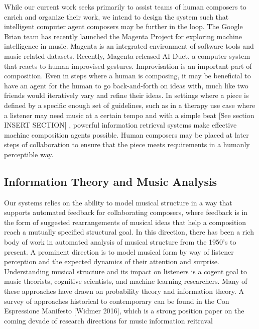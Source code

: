 \documentclass[final,authoryear,11pt,times]{elsarticle}
\begin{document}
While our current work seeks primarily to assist teams of human composers to enrich and organize their work, we intend to design the system such that intelligent computer agent composers may be further in the loop. The Google Brian team has recently launched the Magenta Project for exploring machine intelligence in music. Magenta is an integrated environment of software tools and music-related datasets. Recently, Magenta released AI Duet, a computer system that reacts to human improvised gestures. Improvisation is an important part of composition. Even in steps where a human is composing, it may be beneficial to have an agent for the human to go back-and-forth on ideas with, much like two friends would iteratively vary and refine their ideas. In settings where a piece is defined by a specific enough set of guidelines, such as in a therapy use case where a listener may need music at a certain tempo and with a simple beat [See section INSERT SECTION] , powerful information retrieval systems make effective machine composition agents possible. Human composers may be placed at later steps of collaboration to ensure that the piece meets requirements in a humanly perceptible way.

\subsection{Information Theory and Music Analysis}

Our systems relies on the ability to model musical structure in a way that supports automated feedback for collaborating composers, where feedback is in the form of suggested rearrangements of musical ideas that help a composition reach a mutually specified structural goal. In this direction, there has been a rich body of work in automated analysis of musical structure from the 1950's to present. A prominent direction is to model musical form by way of listener perception and the expected dynamics of their attention and surprise. Understanding musical structure and its impact on listeners is a cogent goal to music theorists, cognitive scientists, and machine learning researchers. Many of these approaches have drawn on probability theory and information theory. A survey of approaches historical to contemporary can be found in the Con Espressione Manifesto [Widmer 2016], which is a strong position paper on the coming devade of research directions for music information reitraval
\end{document}

